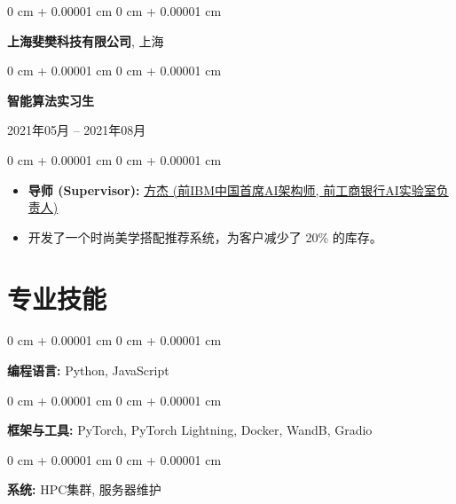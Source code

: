 \documentclass[10pt, letterpaper]{article}
\newenvironment{highlights}{
    \begin{itemize}[
        topsep=0.05 cm,
        parsep=0.05 cm,
        partopsep=0pt,
        itemsep=0pt,
        leftmargin=0.4 cm + 10pt
    ]
}{
    \end{itemize}
} %
\newenvironment{onecolentry}{
    \begin{adjustwidth}{
        0 cm + 0.00001 cm
    }{
        0 cm + 0.00001 cm
    }
}{
    \end{adjustwidth}
} %
\newenvironment{twocolentry}[2][]{
    \onecolentry
    \def\secondColumn{#2}
    \setcolumnwidth{\fill, 4.5 cm}
    \begin{paracol}{2}
}{
    \switchcolumn \raggedleft \secondColumn
    \end{paracol}
    \endonecolentry
} %
\begin{document}
    \vspace{0.2 cm}
    
    \begin{onecolentry}
        \large\textbf{上海斐樊科技有限公司}, 上海
    \end{onecolentry}
    \begin{twocolentry}{
        2021年05月 – 2021年08月
    }
        \textbf{智能算法实习生}
    \end{twocolentry}
    \begin{onecolentry}
        \begin{highlights}
            \item \textbf{导师 (Supervisor):} \href{https://www.linkedin.com/in/jie-fang-28293740}{方杰 (前IBM中国首席AI架构师, 前工商银行AI实验室负责人)}
            \item 开发了一个时尚美学搭配推荐系统，为客户减少了 20\% 的库存。
        \end{highlights}
    \end{onecolentry}

    \section{专业技能}
        \begin{onecolentry}
            \textbf{编程语言:} Python, JavaScript
        \end{onecolentry}
        \begin{onecolentry}
            \textbf{框架与工具:} PyTorch, PyTorch Lightning, Docker, WandB, Gradio
        \end{onecolentry}
        \begin{onecolentry}
            \textbf{系统:} HPC集群, 服务器维护
        \end{onecolentry}
\end{document}
